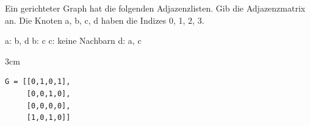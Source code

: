 \question[3]
Ein gerichteter Graph hat die folgenden Adjazenzlisten. Gib die Adjazenzmatrix an. Die Knoten a, b, c, d haben die Indizes 0, 1, 2, 3.

a: b, d \quad b: c \quad c: keine Nachbarn \quad d: a, c
\begin{solutionbox}{3cm}
\begin{lstlisting}
G = [[0,1,0,1],
     [0,0,1,0],
     [0,0,0,0],
     [1,0,1,0]]
\end{lstlisting}
\end{solutionbox}
